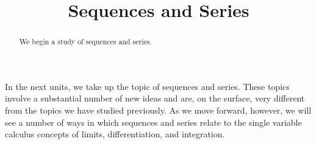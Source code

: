 \documentclass{ximera}
\title{Sequences and Series}
\begin{document}
\begin{abstract}
We begin a study of sequences and series.
\end{abstract}
\maketitle

In the next units, we take up the topic of sequences and series. These topics involve a substantial number of new ideas and are, on the surface, very different from the topics we have studied previously. As we move forward, however, we will see a number of ways in which sequences and series relate to the single variable calculus concepts of limits, differentiation, and integration.
\end{document}
